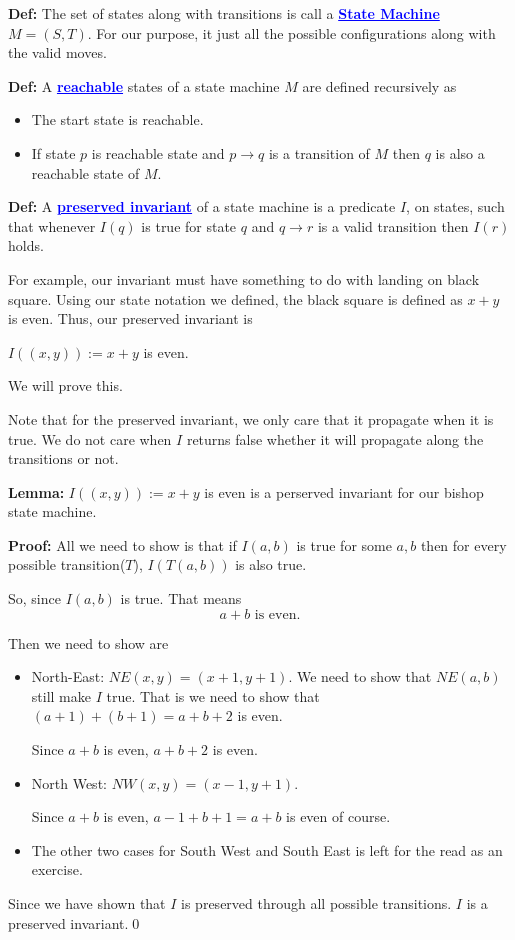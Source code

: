 \documentclass[a4paper, 12pt]{article}
\newcommand{\definition}{\vspace{1em}\noindent\textbf{Def:} }
\renewcommand{\proof}{\vspace{0.5em}\noindent\textbf{Proof:} }
\newcommand{\lemma}{\vspace{1em}\noindent\textbf{Lemma:} }
\newcommand{\qedd}{\qed\newline}
\newcommand{\kwd}[1]{\textcolor{blue}{\textbf{\underline{#1}}}}
\theoremstyle{examplestyle}
\begin{document}
\begin{multicols}{2}
\definition The set of states along with transitions is call a \kwd{State Machine} $M = (S, T)$. For our purpose, it just all the possible configurations along with the valid moves.


\definition A \kwd{reachable} states of a state machine $M$ are defined recursively as
\begin{itemize}
	\item The start state is reachable.
	\item If state $p$ is reachable state and $p \to q$ is a transition of $M$ then $q$ is also a reachable state of $M$.
\end{itemize}

\definition A \kwd{preserved invariant} of a state machine is a predicate $I$, on states, such that whenever $I(q)$ is true for state $q$ and $q\to r$ is a valid transition then $I(r)$ holds.

For example, our invariant must have something to do with landing on black square. Using our state notation we defined, the black square is defined as $x+y$ is even. Thus, our preserved invariant is
\begin{center}
	$I((x,y)):= x+y$ is even.
\end{center}
We will prove this.

Note that for the preserved invariant, we only care that it propagate when it is true. We do not care when $I$ returns false whether it will propagate along the transitions or not.

\lemma $I((x,y)):= x+y$ is even is a perserved invariant for our bishop state machine. 

\proof All we need to show is that if $I(a,b)$ is true for some $a,b$ then for every possible transition($T$), $I(T(a,b))$ is also true.

So, since $I(a,b)$ is true. That means
\[
	a+b \text{ is even.}
\]

Then we need to show are
\begin{itemize}
	\item North-East: $NE(x,y) = (x+1, y+1)$. We need to show that $NE(a,b)$ still make $I$ true. That is we need to show that $(a+1)+(b+1)=a+b+2$ is even.
	
	Since $a+b$ is even, $a+b+2$ is even.\checkmark
	\item North West: $NW(x,y) = (x-1,y+1)$.
	
	Since $a+b$ is even, $a-1+b+1 = a+b$ is even of course.\checkmark
	\item The other two cases for South West and South East is left for the read as an exercise.
\end{itemize}
Since we have shown that $I$ is preserved through all possible transitions. $I$ is a preserved invariant.\qedd


\end{multicols}
\end{document}

